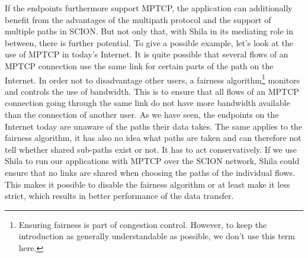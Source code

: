If the endpoints furthermore support MPTCP, the application can additionally benefit from the advantages of the multipath protocol and the support of multiple paths in SCION. But not only that, with Shila in its mediating role in between, there is further potential. To give a possible example, let's look at the use of MPTCP in today's Internet. It is quite possible that several flows of an MPTCP connection use the same link for certain parts of the path on the Internet. In order not to disadvantage other users, a fairness algorithm\footnote{Ensuring fairness is part of congestion control. However, to keep the introduction as generally understandable as possible, we don't use this term here.} monitors and controls the use of bandwidth. This is to ensure that all flows of an MPTCP connection going through the same link do not have more bandwidth available than the connection of another user. As we have seen, the endpoints on the Internet today are unaware of the paths their data takes. The same applies to the fairness algorithm, it has also no idea what paths are taken and can therefore not tell whether shared sub-paths exist or not. It has to act conservatively. If we use Shila to run our applications with MPTCP over the SCION network, Shila could ensure that no links are shared when choosing the paths of the individual flows. This makes it possible to disable the fairness algorithm or at least make it less strict, which results in better performance of the data transfer.